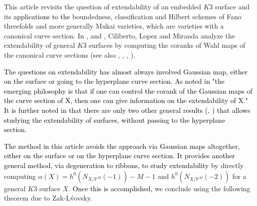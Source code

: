 \documentclass[11pt,twoside]{amsart}
\theoremstyle{plain}
\numberwithin{equation}{section}
\theoremstyle{definition}
\begin{document}
This article revisits the question of extendability of an embedded $K3$ surface and its \textcolor{black}{applications}  \textcolor{black}{to the} boundedness, classification and Hilbert schemes of Fano threefolds and more generally Mukai varieties, which are varieties with a canonical curve section. In \cite{CLM93}, \cite{CLM94} and \cite{CLM98},  Ciliberto, Lopez and Miranda analyze the extendability of general $K3$ surfaces by computing the coranks of Wahl maps of the canonical curve sections (see also \cite{CD22}, \cite{CD24}, \cite{K20}, \cite{Tot20}). %

\smallskip

\textcolor{black}{The questions on extendability has almost always involved Gaussian map, either on the surface or going to the hyperplane curve section. As noted in \cite{Lop23} "the emerging philosophy is that if one can control the corank of the Gaussian maps of the curve section of X, then one can give information on the extendability of X." It is further noted in \cite{Lop23} that there \textcolor{black}{are} only \textcolor{black}{two} other general results (\cite{KLM11}, \cite{CDGK20}) that allows studying the extendability of surfaces, without passing to the hyperplane section.}\

\smallskip

 \textcolor{black}{The method in this article  avoids the approach via Gaussian maps altogether, either on the surface or on the hyperplane curve section. It provides another general method, via degeneration to ribbons, to study extendability} by directly computing $\alpha(X) = h^0(N_{X/\mathbb{P}^M}(-1))-M-1$ and $h^0(N_{X/\mathbb{P}^M}(-2))$ for a general $K3$ surface $X$. \textcolor{black}{Once this is accomplished,} we conclude using the following theorem due to Zak-L\'vovsky. 
\end{document}
